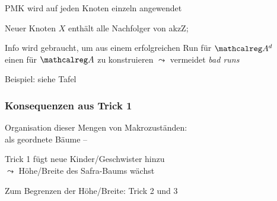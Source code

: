 \begin{frame}
\begin{Itemize}
        \item
          PMK wird auf jeden Knoten einzeln angewendet
        \item
          Neuer Knoten $X$ enthält alle Nachfolger von akzZ;
          \par\smallskip
          Info wird gebraucht, um aus einem erfolgreichen Run für $\Aut{A}^d$\\
          einen für $\Aut{A}$ zu konstruieren
          \hfill
          $\leadsto$ vermeidet \emph{bad runs}
      \end{Itemize}
      Beispiel: siehe Tafel \Tafel

    \end{frame}

    \begin{frame}
      \frametitle{Konsequenzen aus Trick 1}

      \begin{Itemize}
        \item
          Organisation dieser Mengen von Makrozuständen: \\
          als geordnete Bäume -- 
          \par\smallskip
        \item
          Trick 1 fügt neue Kinder/Geschwister hinzu \\
          $\leadsto$ Höhe/Breite des Safra-Baums wächst
          \par\smallskip
        \item
          Zum Begrenzen der Höhe/Breite: Trick 2 und 3
      \end{Itemize}

    \end{frame}

